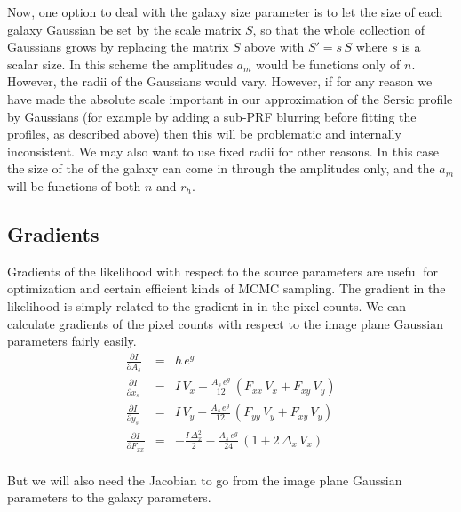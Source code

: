 \documentclass[modern]{aastex6}
\newcommand{\dx}{\Delta_x}
\begin{document}
Now, one option to deal with the galaxy size parameter is to let the size of each galaxy Gaussian be set by the scale matrix $S$, so that the whole collection of Gaussians grows by replacing the matrix $S$ above with $S'=s\,S$ where $s$ is a scalar size.
In this scheme the amplitudes $a_m$ would be functions only of $n$.
However, the radii of the Gaussians would vary.
However, if for any reason we have made the absolute scale important in our approximation of the Sersic profile by Gaussians (for example by adding a sub-PRF blurring before fitting the profiles, as described above) then this will be problematic and internally inconsistent.
We may also want to use fixed radii for other reasons.
In this case the size of the of the galaxy can come in through the amplitudes only, and the $a_m$ will be functions of both $n$ and $r_h$.


\subsection{Gradients}
Gradients of the likelihood with respect to the source parameters are useful for optimization and certain efficient kinds of MCMC sampling.
The gradient in the likelihood is simply related to the gradient in in the pixel counts.
We can calculate gradients of the pixel counts with respect to the  image plane Gaussian parameters fairly easily.
\begin{eqnarray}
\frac{\partial I}{\partial A_s} & = & h \, e^g \\
\frac{\partial I}{\partial x_s} & = & I \, V_x - \frac{A_s \, e^g}{12} \, (F_{xx} \, V_x + F_{xy} \, V_y) \\
\frac{\partial I}{\partial y_s} & = & I \, V_y - \frac{A_s \, e^g}{12} \,  (F_{yy} \, V_y + F_{xy} \, V_y) \\
\frac{\partial I}{\partial F_{xx}} & = & - \frac{I \, \dx^2}{2} - \frac{A_s \, e^g}{24} \,  (1 + 2\, \dx \, V_x) \\
\end{eqnarray}


But we will also need the Jacobian to go from the image plane Gaussian parameters to the galaxy parameters.
\end{document}
